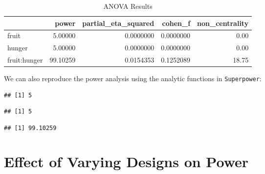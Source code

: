 \documentclass[
]{book}
\newenvironment{Shaded}{\begin{snugshade}}{\end{snugshade}}
\newcommand{\FunctionTok}[1]{\textcolor[rgb]{0.00,0.00,0.00}{#1}}
\newcommand{\NormalTok}[1]{#1}
\newcommand{\OtherTok}[1]{\textcolor[rgb]{0.56,0.35,0.01}{#1}}
\newcommand{\SpecialCharTok}[1]{\textcolor[rgb]{0.00,0.00,0.00}{#1}}
\begin{document}
\begin{table}[!h]

\caption{\label{tab:unnamed-chunk-235}ANOVA Results}
\centering
\begin{tabular}[t]{l|r|r|r|r}
\hline
  & power & partial\_eta\_squared & cohen\_f & non\_centrality\\
\hline
fruit & 5.00000 & 0.0000000 & 0.0000000 & 0.00\\
\hline
hunger & 5.00000 & 0.0000000 & 0.0000000 & 0.00\\
\hline
fruit:hunger & 99.10259 & 0.0154353 & 0.1252089 & 18.75\\
\hline
\end{tabular}
\end{table}

We can also reproduce the power analysis using the analytic functions in \texttt{Superpower}:

\begin{Shaded}
\end{Shaded}

\begin{verbatim}
## [1] 5
\end{verbatim}

\begin{Shaded}
\end{Shaded}

\begin{verbatim}
## [1] 5
\end{verbatim}

\begin{Shaded}
\end{Shaded}

\begin{verbatim}
## [1] 99.10259
\end{verbatim}

\hypertarget{effect-of-varying-designs-on-power}{%
\chapter{Effect of Varying Designs on Power}\label{effect-of-varying-designs-on-power}}
\end{document}

